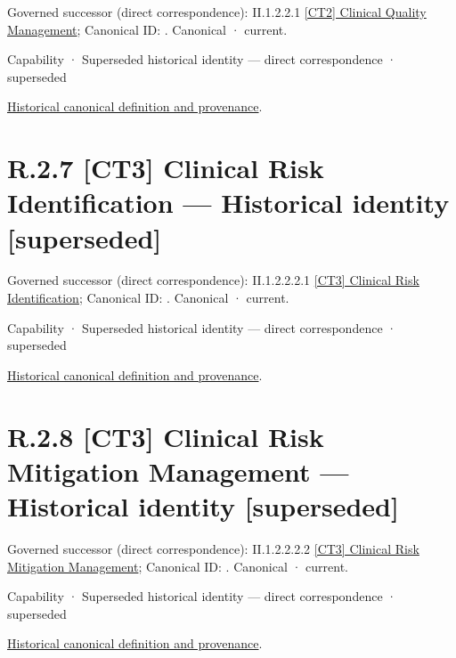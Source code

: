 {\small Governed successor (direct correspondence): II.1.2.2.1 \hyperref[element:89761f2d38f846c39df1df0975964288]{[CT2] Clinical Quality Management}; Canonical ID: \texttt{}. Canonical · current.}\par
\label{element:dc1bece79eb7452e951d03a2ee6dfaa6}
{\small Capability · Superseded historical identity — direct correspondence · superseded}\par
\href{../../../../../../../continuum/strategy/capability/dc1bece79eb7452e951d03a2ee6dfaa6.md}{Historical canonical definition and provenance}.\par
\section*{R.2.7 [CT3] Clinical Risk Identification — Historical identity [superseded]}
\label{navigation:R.2.7}

{\small Governed successor (direct correspondence): II.1.2.2.2.1 \hyperref[element:d54c19c6efaf42af82ad71a4142149d4]{[CT3] Clinical Risk Identification}; Canonical ID: \texttt{}. Canonical · current.}\par
\label{element:690da55f1f5b4c44ba58cf67a717a564}
{\small Capability · Superseded historical identity — direct correspondence · superseded}\par
\href{../../../../../../../continuum/strategy/capability/690da55f1f5b4c44ba58cf67a717a564.md}{Historical canonical definition and provenance}.\par
\section*{R.2.8 [CT3] Clinical Risk Mitigation Management — Historical identity [superseded]}
\label{navigation:R.2.8}

{\small Governed successor (direct correspondence): II.1.2.2.2.2 \hyperref[element:2c232ade21ec45619c3ee4e928bd97ee]{[CT3] Clinical Risk Mitigation Management}; Canonical ID: \texttt{}. Canonical · current.}\par
\label{element:0bd3311d89af45bb935fde20e719369c}
{\small Capability · Superseded historical identity — direct correspondence · superseded}\par
\href{../../../../../../../continuum/strategy/capability/0bd3311d89af45bb935fde20e719369c.md}{Historical canonical definition and provenance}.\par
